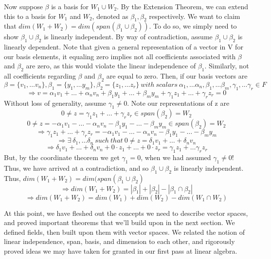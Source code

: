\documentclass[12pt]{article}
\begin{document}
Now suppose $\beta$ is a basis for $W_1 \cup W_2$. By the Extension Theorem, we can extend this to a basis for $W_1$ and $W_2$, denoted as $\beta_1,\beta_2$ respectively. We want to claim that $dim(W_1 + W_2) = dim(span(\beta_1 \cup \beta_2))$. To do so, we simply need to show $\beta_1 \cup \beta_2$ is linearly independent. By way of contradiction, assume $\beta_1 \cup \beta_2$ is linearly dependent. Note that given a general representation of a vector in V for our basis elements, it equaling zero implies not all coefficients associated with $\beta$ and $\beta_2$ are zero, as this would violate the linear independence of $\beta_1$. Similarly, not all coefficients regarding $\beta$ and $\beta_2$ are equal to zero. Then, if our basis vectors are $$\beta = \{ v_1, \dots v_n \}, \beta_1 = \{ y_1, \dots y_m \}, \beta_2 = \{ z_1, \dots z_r \}\ with\ scalars\ \alpha_1, \dots \alpha_n, \beta_1, \dots \beta_m, \gamma_1, \dots \gamma_r \in F$$
$$\Rightarrow v = \alpha_1 v_1 + \dots + \alpha_n v_n + \beta_1 y_1 + \dots + \beta_m y_m + \gamma_1 z_1 + \dots + \gamma_r z_r = 0$$
Without loss of generality, assume $\gamma_1 \neq 0$. Note our representations of z are
$$0 \neq z = \gamma_1 z_1 + \dots + \gamma_r z_r \in span(\beta_2) = W_2$$
$$0 \neq z = -\alpha_1 v_1 - \dots - \alpha_n v_n - \beta_1 y_1 - \dots - \beta_m y_m \in span(\beta_2) = W_2$$
$$\Rightarrow \gamma_1 z_1 + \dots + \gamma_r z_r = -\alpha_1 v_1 - \dots - \alpha_n v_n - \beta_1 y_1 - \dots - \beta_m y_m$$
$$\Rightarrow \exists\ \delta_1, \dots \delta_n\ such\ that\ 0 \neq z = \delta_1 v_1 + \dots + \delta_n v_n$$
$$\Rightarrow \delta_1 v_1 + \dots + \delta_n v_n + 0 \cdot z_1 + \dots + 0 \cdot z_r = \gamma_1 z_1 + \dots \gamma_r z_r$$
But, by the coordinate theorem we get $\gamma_1 = 0$, when we had assumed $\gamma_1 \neq 0$! Thus, we have arrived at a contradiction, and so $\beta_1 \cup \beta_2$ is linearly independent. Thus, $dim(W_1 + W_2) = dim(span(\beta_1 \cup \beta_2)$
$$ \Rightarrow dim (W_1 + W_2) = |\beta_1| + |\beta_2| - |\beta_1 \cap \beta_2|$$
$$ \Rightarrow dim(W_1 + W_2) = dim(W_1) + dim(W_2) - dim(W_1 \cap W_2)$$

At this point, we have fleshed out the concepts we need to describe vector spaces, and proved important theorems that we'll build upon in the next section. We defined fields, then built upon them with vector spaces. We related the notion of linear independence, span, basis, and dimension to each other, and rigorously proved ideas we may have taken for granted in our first pass at linear algebra.
\end{document}
